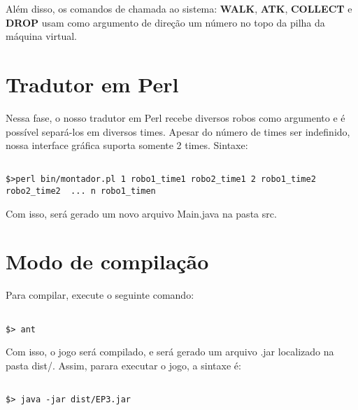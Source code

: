 \documentclass[11pt]{article}
\begin{document}
Além disso, os comandos de chamada ao sistema: \textbf{WALK}, \textbf{ATK}, \textbf{COLLECT} e \textbf{DROP} usam como argumento de direção um número no topo da pilha da máquina virtual.







\section{Tradutor em Perl}

Nessa fase, o nosso tradutor em Perl recebe diversos robos como argumento e é possível separá-los em diversos times. Apesar do número de times ser indefinido, nossa interface gráfica suporta somente 2 times. Sintaxe:

\begin{verbatim}

$>perl bin/montador.pl 1 robo1_time1 robo2_time1 2 robo1_time2 robo2_time2  ... n robo1_timen

\end{verbatim}

Com isso, será gerado um novo arquivo Main.java na pasta src.

\section{Modo de compilação}

Para compilar, execute o seguinte comando:

\begin{verbatim}

$> ant

\end{verbatim}

Com isso, o jogo será compilado, e será gerado um arquivo .jar localizado na pasta dist/. Assim, parara executar o jogo, a sintaxe é:

\begin{verbatim}

$> java -jar dist/EP3.jar

\end{verbatim}
\end{document}

